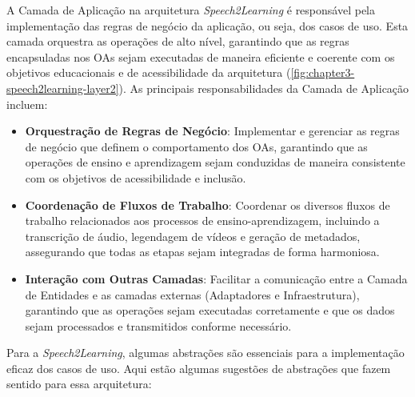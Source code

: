 A Camada de Aplicação na arquitetura \textit{Speech2Learning} é responsável pela implementação das regras de negócio da aplicação, ou seja, dos casos de uso. Esta camada orquestra as operações de alto nível, garantindo que as regras encapsuladas nos OAs sejam executadas de maneira eficiente e coerente com os objetivos educacionais e de acessibilidade da arquitetura (\autoref{fig:chapter3-speech2learning-layer2}). As principais responsabilidades da Camada de Aplicação incluem:

\begin{itemize}
    \item \textbf{Orquestração de Regras de Negócio}: Implementar e gerenciar as regras de negócio que definem o comportamento dos OAs, garantindo que as operações de ensino e aprendizagem sejam conduzidas de maneira consistente com os objetivos de acessibilidade e inclusão.

    \item \textbf{Coordenação de Fluxos de Trabalho}: Coordenar os diversos fluxos de trabalho relacionados aos processos de ensino-aprendizagem, incluindo a transcrição de áudio, legendagem de vídeos e geração de metadados, assegurando que todas as etapas sejam integradas de forma harmoniosa.

    \item \textbf{Interação com Outras Camadas}: Facilitar a comunicação entre a Camada de Entidades e as camadas externas (Adaptadores e Infraestrutura), garantindo que as operações sejam executadas corretamente e que os dados sejam processados e transmitidos conforme necessário.
\end{itemize}

Para a \textit{Speech2Learning}, algumas abstrações são essenciais para a implementação eficaz dos casos de uso. Aqui estão algumas sugestões de abstrações que fazem sentido para essa arquitetura:

